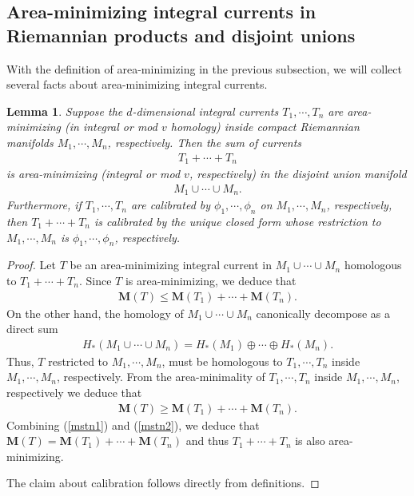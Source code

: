 \documentclass[11pt,a4paper]{amsart}
\numberwithin{equation}{section}
\newcommand{\ms}{\mathbf{M}}
\newcommand{\cd}{\cdots}
\theoremstyle{plain}
\newtheorem{lem}[exam]{Lemma}
\theoremstyle{definition}
\numberwithin{equation}{subsection}
\begin{document}
\subsection{Area-minimizing integral currents in Riemannian products and disjoint unions}\label{basdis}
With the definition of area-minimizing in the previous subsection, we will collect several facts about area-minimizing integral currents.
\begin{lem}\label{lemdis}
Suppose the $d$-dimensional integral currents $T_1,\cd,T_n$ are area-minimizing (in integral or mod $v$ homology) inside compact Riemannian manifolds $M_1,\cd,M_n$, respectively. Then the sum of currents
\begin{align*}
T_1+\cd+T_n
\end{align*}
is area-minimizing (integral or mod $v$, respectively) in the disjoint union manifold
\begin{align*}
M_1\cup\cd \cup M_n.
\end{align*}
Furthermore, if $T_1,\cd,T_n$ are calibrated by $\phi_1,\cd,\phi_n$ on $M_1,\cd,M_n$, respectively, then $T_1+\cd+T_n$ is calibrated by the unique closed form whose restriction to $M_1,\cd,M_n$ is $\phi_1,\cd,\phi_n$, respectively. 
\end{lem}
\begin{proof}
Let $T$ be an area-minimizing integral current in $M_1\cup \cd\cup M_n$ homologous to $T_1+\cd+T_n$. Since $T$ is area-minimizing, we deduce that 
\begin{align}\label{mstn1}
\ms(T)\le\ms(T_1)+\cd+\ms(T_n).
\end{align}
On the other hand, the homology of $M_1\cup \cd\cup M_n$ canonically decompose as a direct sum
\begin{align}\label{homdec}
H_\ast(M_1\cup \cd\cup M_n)=H_\ast(M_1)\oplus\cd\oplus H_\ast(M_n).
\end{align}
Thus, $T$ restricted to $M_1,\cd,M_n$, must be homologous to $T_1,\cd,T_n$ inside $M_1,\cd,M_n$, respectively. From the area-minimality of $T_1,\cd,T_n$ inside $M_1,\cd,M_n$, respectively we deduce that  
\begin{align}\label{mstn2}
\ms(T)\ge\ms(T_1)+\cd+\ms(T_n).
\end{align}
Combining (\ref{mstn1}) and (\ref{mstn2}), we deduce that $\ms(T)=\ms(T_1)+\cd+\ms(T_n)$ and thus $T_1+\cd+T_n$ is also area-minimizing.

The claim about calibration follows directly from definitions.
\end{proof}
\end{document}
